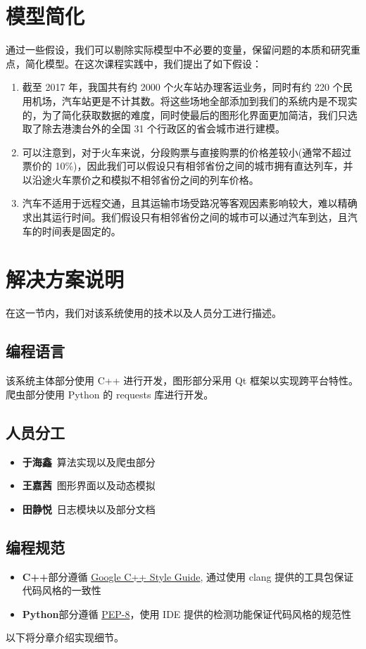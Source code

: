 \documentclass[lang=cn,blue,14pt]{elegantbook}
\begin{document}
\section{模型简化}
通过一些假设，我们可以剔除实际模型中不必要的变量，保留问题的本质和研究重点，简化模型。在这次课程实践中，我们提出了如下假设：
\begin{enumerate}
	\item 截至 2017 年，我国共有约 2000 个火车站办理客运业务，同时有约 220 个民用机场，汽车站更是不计其数。将这些场地全部添加到我们的系统内是不现实的，为了简化获取数据的难度，同时使最后的图形化界面更加简洁，我们只选取了除去港澳台外的全国 31 个行政区的省会城市进行建模。
	\item 可以注意到，对于火车来说，分段购票与直接购票的价格差较小(通常不超过票价的 10\%)，因此我们可以假设只有相邻省份之间的城市拥有直达列车，并以沿途火车票价之和模拟不相邻省份之间的列车价格。
	\item 汽车不适用于远程交通，且其运输市场受路况等客观因素影响较大，难以精确求出其运行时间。我们假设只有相邻省份之间的城市可以通过汽车到达，且汽车的时间表是固定的。
\end{enumerate}

\section{解决方案说明}

在这一节内，我们对该系统使用的技术以及人员分工进行描述。

\subsection{编程语言}

该系统主体部分使用 C++ 进行开发，图形部分采用 Qt 框架以实现跨平台特性。爬虫部分使用 Python 的 requests 库进行开发。

\subsection{人员分工}
\begin{itemize}
	\item \textbf{于海鑫}\ 算法实现以及爬虫部分
	\item \textbf{王嘉茜}\ 图形界面以及动态模拟
	\item \textbf{田静悦}\ 日志模块以及部分文档
\end{itemize}

\subsection{编程规范}
\begin{itemize}
	\item \textbf{C++}部分遵循 \href{http://www.nscscc.org/uploads/soft/170318/1-1F31P20H9.docxhttp://google.github.io/styleguide/cppguide}{Google C++ Style Guide}, 通过使用 clang 提供的工具包保证代码风格的一致性
	\item \textbf{Python}部分遵循 \href{https://www.python.org/dev/peps/pep-0008/}{PEP-8}，使用 IDE 提供的检测功能保证代码风格的规范性
\end{itemize}
\vspace*{3 ex}
以下将分章介绍实现细节。
\end{document}
